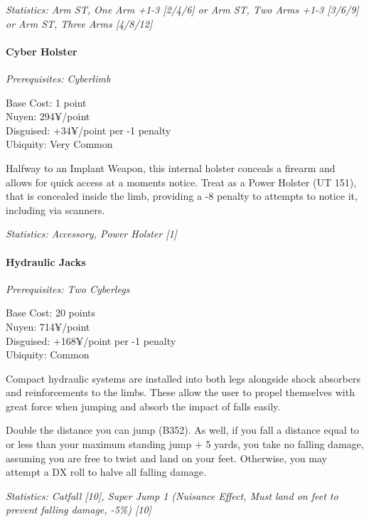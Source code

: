 \begin{multicols*}{3}
	\textit{\textcolor{OliveGreen}{Statistics: Arm ST, One Arm +1-3 [2/4/6] or Arm ST, Two Arms +1-3 [3/6/9] or Arm ST, Three Arms [4/8/12]}}
	
	
	\paragraph{Cyber Holster}
	\textit{Prerequisites: Cyberlimb}
	\begin{flushright}
		Base Cost: 1 point\\
		Nuyen: 294¥/point\\
		Disguised: +34¥/point per -1 penalty\\
		Ubiquity: Very Common\\
	\end{flushright}

	Halfway to an Implant Weapon, this internal holster conceals a firearm and allows for quick access at a moments notice. Treat as a Power Holster (UT 151), that is concealed inside the limb, providing a -8 penalty to attempts to notice it, including via scanners.
	
	\textit{\textcolor{OliveGreen}{Statistics: Accessory, Power Holster [1]}}
	
	\paragraph{Hydraulic Jacks}
	\textit{Prerequisites: Two Cyberlegs}
	\begin{flushright}
		Base Cost: 20 points\\
		Nuyen: 714¥/point\\
		Disguised: +168¥/point per -1 penalty\\
		Ubiquity: Common\\
	\end{flushright}
	
	Compact hydraulic systems are installed into both legs alongside shock absorbers and reinforcements to the limbs. These  allow the user to propel themselves with great force when jumping and absorb the impact of falls easily.
	
	Double the distance you can jump (B352). As well, if you fall a distance equal to or less than your maximum standing jump + 5 yards, you take no falling damage, assuming you are free to twist and land on your feet. Otherwise, you may attempt a DX roll to halve all falling damage.
	
	\textit{\textcolor{OliveGreen}{Statistics: Catfall [10], Super Jump 1 (Nuisance Effect, Must land on feet to prevent falling damage, -5\%) [10]}}
	

\end{multicols*}
